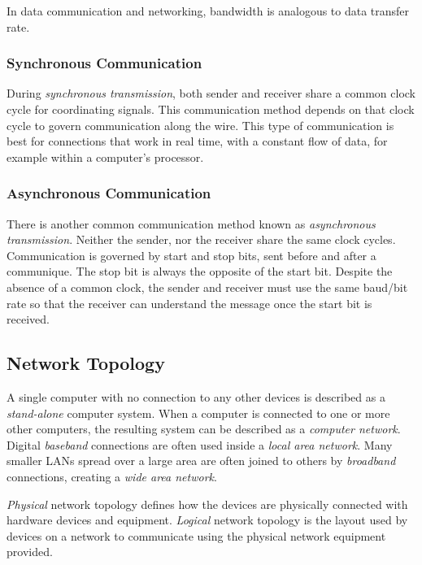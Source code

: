 \documentclass[9pt]{article}
\begin{document}
In data communication and networking, bandwidth is analogous to data transfer rate.

\subsubsection{Synchronous Communication}
\label{sec:orgfaba28e}

During \emph{synchronous transmission}, both sender and receiver share a common clock cycle for coordinating signals. This communication method depends on that clock cycle to govern communication along the wire. This type of communication is best for connections that work in real time, with a constant flow of data, for example within a computer's processor.

\subsubsection{Asynchronous Communication}
\label{sec:org55e577a}

There is another common communication method known as \emph{asynchronous transmission}. Neither the sender, nor the receiver share the same clock cycles. Communication is governed by start and stop bits, sent before and after a communique. The stop bit is always the opposite of the start bit. Despite the absence of a common clock, the sender and receiver must use the same baud/bit rate so that the receiver can understand the message once the start bit is received.

\subsection{Network Topology}
\label{sec:orge0b0405}

A single computer with no connection to any other devices is described as a \emph{stand-alone} computer system. When a computer is connected to one or more other computers, the resulting system can be described as a \emph{computer network}. Digital \emph{baseband} connections are often used inside a \emph{local area network}. Many smaller LANs spread over a large area are often joined to others by \emph{broadband} connections, creating a \emph{wide area network}.

\emph{Physical} network topology defines how the devices are physically connected with hardware devices and equipment. \emph{Logical} network topology is the layout used by devices on a network to communicate using the physical network equipment provided.
\end{document}
